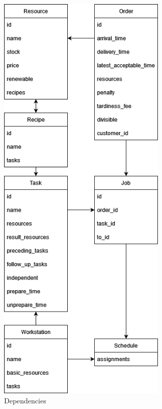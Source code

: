\documentclass[a4paper,12pt,twoside]{scrreprt}
\begin{document}
\begin{figure}[H]
	\centering
	\includegraphics[width=8cm]{images/dependencies}
	\caption{Dependencies}
	\label{fig:dependencies}
\end{figure}
\end{document}
